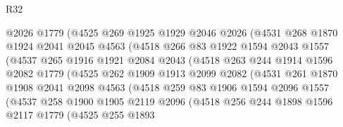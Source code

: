\begin{lexlean}{R32}
\begin{coremodule}
                    @2026
                    @1779
                    (@4525
                      @269
                      @1925
                      @1929
                      @2046
                      @2026
                      (@4531
                        @268
                        @1870
                        @1924
                        @2041
                        @2045
                        @4563
                        (@4518
                          @266
                          @83
                          @1922
                          @1594
                          @2043
                          @1557
                          (@4537
                            @265
                            @1916
                            @1921
                            @2084
                            @2043
                            (@4518
                              @263
                              @244
                              @1914
                              @1596
                              @2082
                              @1779
                              (@4525
                                @262
                                @1909
                                @1913
                                @2099
                                @2082
                                (@4531
                                  @261
                                  @1870
                                  @1908
                                  @2041
                                  @2098
                                  @4563
                                  (@4518
                                    @259
                                    @83
                                    @1906
                                    @1594
                                    @2096
                                    @1557
                                    (@4537
                                      @258
                                      @1900
                                      @1905
                                      @2119
                                      @2096
                                      (@4518
                                        @256
                                        @244
                                        @1898
                                        @1596
                                        @2117
                                        @1779
                                        (@4525
                                          @255
                                          @1893

\end{coremodule}
\end{lexlean}
